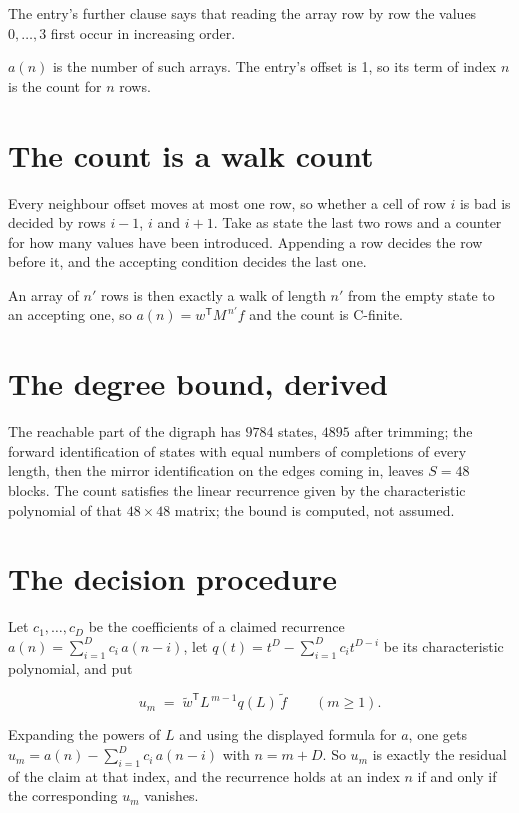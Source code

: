 \documentclass[11pt]{article}
\theoremstyle{definition}
\begin{document}
The entry's further clause says that reading the array row by row the values $0,\dots,3$ first occur in increasing order.

$a(n)$ is the number of such arrays. The entry's offset is 1, so its term of index $n$ is the count for $n$ rows.

\section{The count is a walk count}

Every neighbour offset moves at most one row, so whether a cell of row $i$ is bad is decided by rows $i-1$, $i$ and $i+1$. Take as state the last two rows and a counter for how many values have been introduced. Appending a row decides the row before it, and the accepting condition decides the last one.

An array of $n'$ rows is then exactly a walk of length $n'$ from the empty state to an accepting one, so $a(n) = w^{\mathsf T}M^{\,n'}f$ and the count is C-finite.

\section{The degree bound, derived}

The reachable part of the digraph has $9784$ states, $4895$ after trimming; the forward identification of states with equal numbers of completions of every length, then the mirror identification on the edges coming in, leaves $S = 48$ blocks. The count satisfies the linear recurrence given by the characteristic polynomial of that $48\times48$ matrix; the bound is computed, not assumed.

\section{The decision procedure}

Let $c_1,\dots,c_D$ be the coefficients of a claimed recurrence $a(n) = \sum_{i=1}^{D} c_i\,a(n-i)$, let $q(t) = t^{D} - \sum_{i=1}^{D} c_i t^{D-i}$ be its characteristic polynomial, and put

\[u_m \;=\; \tilde w^{\mathsf T} L^{\,m-1} q(L)\,\tilde f \qquad (m \ge 1).\]

Expanding the powers of $L$ and using the displayed formula for $a$, one gets $u_m = a(n) - \sum_{i=1}^{D} c_i\,a(n-i)$ with $n = m + D$. So $u_m$ is exactly the residual of the claim at that index, and the recurrence holds at an index $n$ if and only if the corresponding $u_m$ vanishes.
\end{document}

